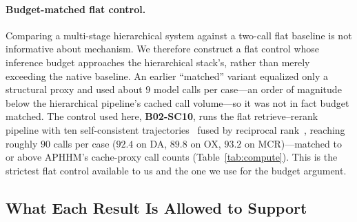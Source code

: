 \paragraph{Budget-matched flat control.}
Comparing a multi-stage hierarchical system against a two-call flat baseline is not informative about mechanism.
We therefore construct a flat control whose inference budget approaches the hierarchical stack's, rather than merely exceeding the native baseline.
An earlier ``matched'' variant equalized only a structural proxy and used about $9$ model calls per case---an order of magnitude below the hierarchical pipeline's cached call volume---so it was not in fact budget matched.
The control used here, \textbf{B02-SC10}, runs the flat retrieve--rerank pipeline with ten self-consistent trajectories~\cite{wang2023selfconsistency} fused by reciprocal rank~\cite{rrf2009}, reaching roughly $90$ calls per case ($92.4$ on DA, $89.8$ on OX, $93.2$ on MCR)---matched to or above APHHM's cache-proxy call counts (Table~\ref{tab:compute}).
This is the strictest flat control available to us and the one we use for the budget argument.

\subsection{What Each Result Is Allowed to Support}
\label{sec:claim-map}

